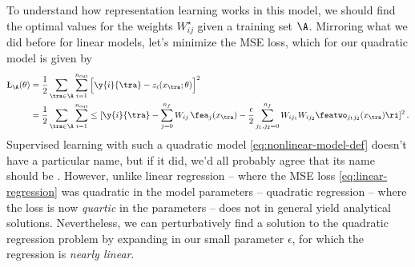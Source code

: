 To understand how representation learning works in this model, we should find the optimal values for the weights $W_{ij}^\star$ given a training set $\A$. Mirroring what we did before for linear models, let's minimize the MSE loss, which for our quadratic model is given by
\begin{align}\label{eq:quadratic-regression}
\L_{\A}(\theta)&=\frac{1}{2}\sum_{\tra\in\A}\sum_{i=1}^{n_{\text{out}}}\Big[ \y{i}{\tra} - z_i(x_{\tra}; \theta) \Big]^2  \\
&=\frac{1}{2}\sum_{\tra\in\A}\sum_{i=1}^{n_{\text{out}}}\le[\y{i}{\tra} - \sum_{j=0}^{n_f} W_{ij} \, \fea_{j}(x_{\tra})  - \frac{\epsilon}{2}\sum_{j_1,j_2=0}^{n_f} W_{ij_1}W_{ij_2} \featwo_{j_1j_2}(x_{\tra}) \ri]^2\, . \notag
\end{align}
Supervised learning with such a quadratic model \eqref{eq:nonlinear-model-def} doesn't have a particular name, but if it did, we'd all probably agree that its name should be .
However, unlike linear regression -- where the MSE loss  \eqref{eq:linear-regression} was quadratic in the model parameters -- quadratic regression -- where the loss is now \emph{quartic} in the parameters -- does not in general yield analytical solutions. Nevertheless, we can perturbatively find a solution to the quadratic regression problem by expanding in our small parameter $\epsilon$, for which the regression is \emph{nearly linear}.






